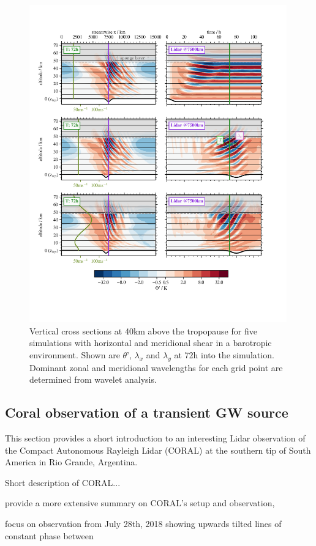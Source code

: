 \begin{figure}[]
    \centering
    \includegraphics[width=0.99\textwidth]{figures_lidar/lidana_th.png}
    \caption{Vertical cross sections at 40km above the tropopause for five simulations with horizontal and meridional shear in a barotropic environment. Shown are $\theta$', $\lambda_x$ and $\lambda_y$ at 72h into the simulation. Dominant zonal and meridional wavelengths for each grid point are determined from wavelet analysis.}
    \label{fig:waveletAna_dudy}
\end{figure}


\subsection{Coral observation of a transient GW source}
\label{sec:lidOb-coral}

This section provides a short introduction to an interesting Lidar observation of the Compact Autonomous Rayleigh Lidar (CORAL) at the southern tip of South America in Rio Grande, Argentina. 

Short description of CORAL...

\textcite{kaifler_compact_2021} provide a more extensive summary on CORAL's setup and observation, 

focus on observation from July 28th, 2018 showing upwards tilted lines of constant phase between 


